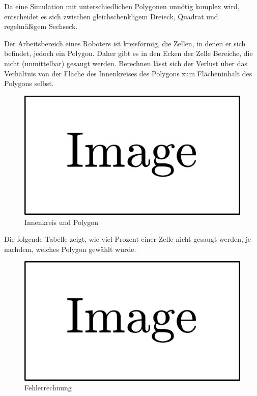 \documentclass{article}
\begin{document}
Da eine Simulation mit unterschiedlichen Polygonen unnötig komplex
wird, entscheidet es sich zwischen gleichschenkligem Dreieck, 
Quadrat und regelmäßigem Sechseck.

Der Arbeitsbereich eines Roboters ist kreisförmig, die Zellen, in denen er
sich befindet, jedoch ein Polygon. Daher gibt es in den Ecken der Zelle 
Bereiche, die nicht (unmittelbar) gesaugt werden. Berechnen lässt 
sich der Verlust über das Verhältnis von der Fläche des Innenkreises 
des Polygons zum Flächeninhalt des Polygons selbst. 

\begin{figure}
\includegraphics{img/dummy.png}
\caption{Innenkreis und Polygon}
\label{img:floor_quotient_circle_polygon}
\end{figure}

Die folgende Tabelle zeigt, wie viel Prozent einer Zelle nicht gesaugt werden,
je nachdem, welches Polygon gewählt wurde.

\begin{figure}
\includegraphics{img/dummy.png}
\caption{Fehlerrechnung}
\label{img:floor_error_circle_polygon}
\end{figure}
\end{document}
